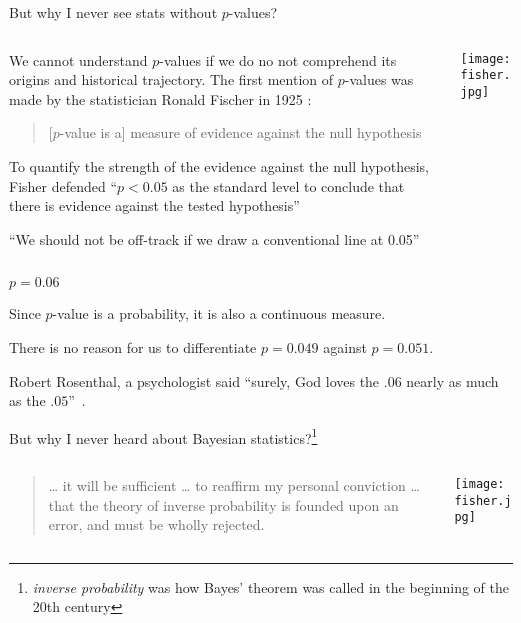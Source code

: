 \begin{frame}{But why I never see stats without $p$-values?}
	\begin{columns}
		\begin{column}{0.8\textwidth}
			We cannot understand $p$-values if we do no not comprehend
			its origins and historical trajectory.
			The first mention of $p$-values was made by the statistician
			Ronald Fischer in 1925 \parencite{fisher1925statistical}:
			\begin{quotation}
				[$p$-value is a] measure of evidence against the null hypothesis
			\end{quotation}
			\begin{vfilleditems}
				\item To quantify the strength of the evidence against the null hypothesis,
				Fisher defended ``$p<0.05$ as the standard level to conclude that there is evidence against the tested hypothesis''
				\item ``We should not be off-track if we draw a conventional line at 0.05''
			\end{vfilleditems}
		\end{column}
		\begin{column}{0.2\textwidth}
			\centering
			\texttt{[image: fisher.jpg]}
		\end{column}
	\end{columns}
\end{frame}

\begin{frame}{$p = 0.06$}
	\begin{vfilleditems}
		\item Since $p$-value is a probability, it is also a continuous measure.
		\item There is no reason for us to differentiate $p = 0.049$ against $p = 0.051$.
		\item Robert Rosenthal, a psychologist said ``surely, God loves the $.06$ nearly as much as the $.05$''~\parencite{rosnow1989statistical}.
	\end{vfilleditems}
\end{frame}

\begin{frame}{But why I never heard about Bayesian statistics?\footnote{\textit{inverse probability}
			was how Bayes' theorem was called in the beginning of the 20th century}}
	\begin{columns}
		\begin{column}{0.8\textwidth}
			\begin{quotation}
				… it will be sufficient … to reaffirm my personal conviction …
				that the theory of inverse probability is founded upon an error,
				and must be wholly rejected.
			\end{quotation}
			\vfill \vfill
			\textcite{fisher1925statistical}
		\end{column}
		\begin{column}{0.2\textwidth}
			\centering
			\texttt{[image: fisher.jpg]}
		\end{column}
	\end{columns}
\end{frame}

